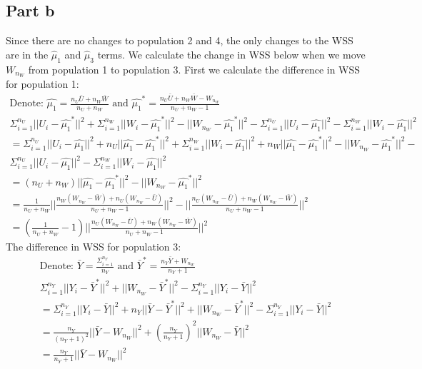 \documentclass{article}\usepackage[]{graphicx}\usepackage[]{color}
\begin{document}
\subsection*{Part b}
Since there are no changes to population 2 and 4, the only changes to the WSS are in the $\hat{\mu}_1$ and $\hat{\mu}_3$ terms.  We calculate the change in WSS below when we move $W_{n_W}$ from population 1 to population 3.  First we calculate the difference in WSS for population 1:
\begin{align*}
\text{Denote: } \hat{\mu_1} = \frac{n_U\bar{U} + n_W\bar{W}}{n_U + n_W} \text{ and } \hat{\mu_1}^* = \frac{n_U\bar{U} + n_W\bar{W} - W_{n_W}}{n_U + n_W - 1}\\
\Sigma_{i=1}^{n_U}||U_i - \hat{\mu_1}^*||^2 + \Sigma_{i=1}^{n_W}||W_i - \hat{\mu_1}^*||^2 - ||W_{n_W} - \hat{\mu_1}^*||^2 - \Sigma_{i=1}^{n_U}||U_i - \hat{\mu_1}||^2 - \Sigma_{i=1}^{n_W}||W_i - \hat{\mu_1}||^2\\
= \Sigma_{i=1}^{n_U}||U_i - \hat{\mu_1}||^2 + n_U||\hat{\mu_1} - \hat{\mu_1}^*||^2 + \Sigma_{i=1}^{n_W}||W_i - \hat{\mu_1}||^2 + n_W||\hat{\mu_1} - \hat{\mu_1}^*||^2 - ||W_{n_W} - \hat{\mu_1}^*||^2 - \\
\Sigma_{i=1}^{n_U}||U_i - \hat{\mu_1}||^2 - \Sigma_{i=1}^{n_W}||W_i - \hat{\mu_1}||^2\\
= (n_U + n_W)||\hat{\mu_1} - \hat{\mu_1}^*||^2 - ||W_{n_W} - \hat{\mu_1}^*||^2 \\
= \frac{1}{n_U + n_W}||\frac{n_W(W_{n_W} - \bar{W}) + n_U(W_{n_W} - \bar{U})}{n_U + n_W - 1}||^2 - ||\frac{n_U(W_{n_W} - \bar{U}) + n_W(W_{n_W} - \bar{W})}{n_U + n_W - 1}||^2\\
= (\frac{1}{n_U + n_W} - 1)||\frac{n_U(W_{n_W} - \bar{U}) + n_W(W_{n_W} - \bar{W})}{n_U + n_W - 1}||^2
\end{align*}
The difference in WSS for population 3:
\begin{align*}
\text{Denote: } \bar{Y} = \frac{\Sigma_{i=1}^{n_Y}}{n_Y} \text{ and } \bar{Y}^* = \frac{n_Y\bar{Y} + W_{n_W}}{n_Y + 1}\\
\Sigma_{i=1}^{n_Y}||Y_i - \bar{Y}^*||^2 + ||W_{n_W} - \bar{Y}^*||^2 - \Sigma_{i=1}^{n_Y}||Y_i - \bar{Y}||^2\\
=\Sigma_{i=1}^{n_Y}||Y_i - \bar{Y}||^2 + n_Y||\bar{Y} - \bar{Y}^*||^2 + ||W_{n_W} - \bar{Y}^*||^2 - \Sigma_{i=1}^{n_Y}||Y_i - \bar{Y}||^2\\
=\frac{n_Y}{(n_Y + 1)^2}||\bar{Y} - W_{n_W}||^2 + (\frac{n_Y}{n_Y + 1})^2||W_{n_W} - \bar{Y}||^2\\
=\frac{n_Y}{n_Y + 1}||\bar{Y} - W_{n_W}||^2
\end{align*}
\end{document}
